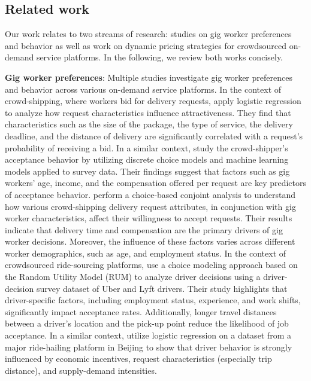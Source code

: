 \subsection{Related work}

Our work relates to two streams of research: studies on  gig worker preferences and behavior as well as work on dynamic pricing strategies for crowdsourced on-demand service platforms. In the following, we review both works concisely.

\noindent \textbf{Gig worker preferences}:
Multiple studies investigate gig worker preferences and behavior across various on-demand service platforms. In the context of crowd-shipping, where workers bid for delivery requests, \cite{ermagun2018bid} apply logistic regression to analyze how request characteristics influence attractiveness. They find that characteristics such as the size of the package, the type of service, the delivery deadline, and the distance of delivery are significantly correlated with a request's probability of receiving a bid. In a similar context, \cite{hou2023order} study the crowd-shipper's acceptance behavior by utilizing discrete choice models and machine learning models applied to survey data. Their findings suggest that factors such as gig workers’ age, income, and the compensation offered per request are key predictors of acceptance behavior. \cite{bathke2023occasional} perform a choice-based conjoint analysis to understand how various crowd-shipping delivery request attributes, in conjunction with gig worker characteristics, affect their willingness to accept requests. Their results indicate that delivery time and compensation are the primary drivers of gig worker decisions. Moreover, the influence of these factors varies across different worker demographics, such as age, and employment status. In the context of crowdsourced ride-sourcing platforms,  \cite{ashkrof2022ride} use a choice modeling approach based on the Random Utility Model (RUM) to analyze driver decisions using a driver-decision survey dataset of Uber and Lyft drivers. Their study highlights that driver-specific factors, including employment status, experience, and work shifts, significantly impact acceptance rates. Additionally, longer travel distances between a driver’s location and the pick-up point reduce the likelihood of job acceptance. In a similar context, \cite{xu2018empirical} utilize logistic regression on a dataset from a major ride-hailing platform in Beijing to show that driver behavior is strongly influenced by economic incentives, request characteristics (especially trip distance), and supply-demand intensities. 

